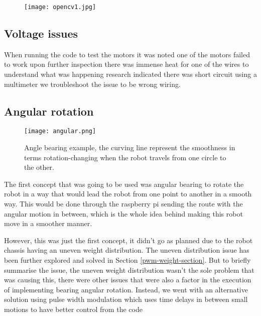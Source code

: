 \documentclass[11pt]{article}
\begin{document}
	
	\begin{center}
		
		
		\begin{figure}[H]
			\centering
			\texttt{[image: opencv1.jpg]}
			
			
		\end{figure}
	\end{center}
	
	
	
	
		\subsection{Voltage issues}
		When running the code to test the motors it was noted one of the motors failed to work upon further inspection there was immense heat for one of the wires to understand what was happening research indicated there was short circuit using a multimeter we troubleshoot the issue to be wrong wiring.
		
	\subsection{	Angular rotation }



\begin{figure}[H]
	\centerline{\texttt{[image: angular.png]}}
	\caption{Angle bearing example, the curving line represent the smoothness in terms rotation-changing when the robot travels from one circle to the other.}
	\label{stft_figure}
		\end{figure}   
	
	The first concept that was going to be used was angular bearing to rotate the robot in a way that would lead the robot from one point to another in a smooth way. This would be done through the raspberry pi sending the route with the angular motion in between, which is the whole idea behind making this robot move in a smoother manner.
	
	
	However, this was just the first concept, it didn't go as planned due to the robot chassis having an uneven weight distribution. The uneven distribution issue has been further explored and solved in Section \ref{pwm-weight-section}. But to briefly summarise the issue, the uneven weight distribution wasn't the sole problem that was causing this, there were other issues that were also a factor in the execution of implementing bearing angular rotation. Instead, we went with an alternative solution using pulse width modulation which uses time delays in between small motions to have better control from the code
\end{document}
